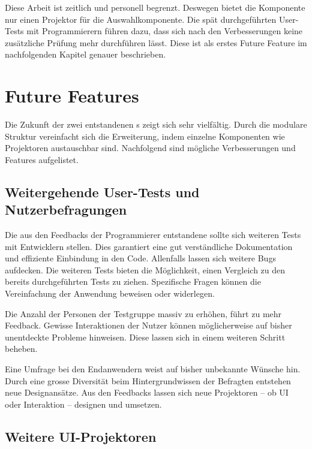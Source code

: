Diese Arbeit ist zeitlich und personell begrenzt. 
Deswegen bietet die Komponente nur einen Projektor für die Auswahlkomponente. 
Die spät durchgeführten User-Tests mit Programmierern führen dazu, dass sich nach den Verbesserungen keine zusätzliche Prüfung mehr durchführen lässt. 
Diese ist als erstes Future Feature im nachfolgenden Kapitel genauer beschrieben. 


\section{Future Features}
\label{sec:future}

Die Zukunft der zwei entstandenen s zeigt sich sehr vielfältig. 
Durch die modulare Struktur vereinfacht sich die Erweiterung, indem einzelne Komponenten wie Projektoren austauschbar sind. 
Nachfolgend sind mögliche Verbesserungen und Features aufgelistet. 


\subsection{Weitergehende User-Tests und Nutzerbefragungen}
\label{sec:moreUserTests}

Die aus den Feedbacks der Programmierer entstandene  sollte sich weiteren Tests mit Entwicklern stellen. 
Dies garantiert eine gut verständliche Dokumentation und effiziente Einbindung in den Code. 
Allenfalls lassen sich weitere Bugs aufdecken. 
Die weiteren Tests bieten die Möglichkeit, einen Vergleich zu den bereits durchgeführten Tests zu ziehen. 
Spezifische Fragen können die Vereinfachung der Anwendung beweisen oder widerlegen. 

Die Anzahl der Personen der Testgruppe massiv zu erhöhen, führt zu mehr Feedback. 
Gewisse Interaktionen der Nutzer können möglicherweise auf bisher unentdeckte Probleme hinweisen. 
Diese lassen sich in einem weiteren Schritt beheben. 

Eine Umfrage bei den Endanwendern weist auf bisher unbekannte Wünsche hin. 
Durch eine grosse Diversität beim Hintergrundwissen der Befragten entstehen neue Designansätze. 
Aus den Feedbacks lassen sich neue Projektoren – ob UI oder Interaktion – designen und umsetzen. 


\subsection{Weitere UI-Projektoren}
\label{sec:moreUi}

